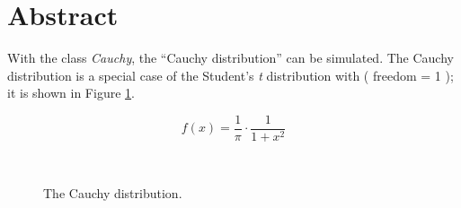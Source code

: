 %

\section{Abstract}

\noindent
With the class {\em Cauchy}, the ``Cauchy distribution'' can be
simulated. The Cauchy distribution is a special case of the Student's
{\em t} distribution with ( freedom = 1 ); it is shown in Figure \ref{Cauchy}.

\begin{equation}
f(x) = \frac{1}{\pi} \cdot \frac{1}{1+x^2}
\end{equation}

\vspace*{10mm}

\begin{center}
\begin{figure}[h]
\\
\caption{The Cauchy distribution.}
\label{Cauchy}
\end{figure}
\end{center}

